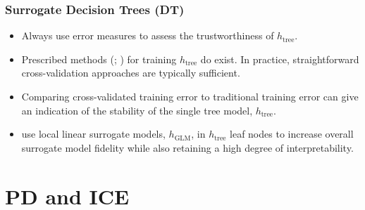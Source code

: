 \documentclass[11pt,
               aspectratio=169
               ]{beamer}
\begin{document}
		\begin{frame}
		
			\frametitle{Surrogate Decision Trees (DT)}
			
			\begin{itemize}
				
				\item Always use error measures to assess the trustworthiness of $h_{\text{tree}}$.
	
				\item Prescribed methods (\cite{dt_surrogate1}; \cite{dt_surrogate2}) for training $h_{\text{tree}}$ do exist. In practice, straightforward cross-validation approaches are typically sufficient. 
				
				\item Comparing cross-validated training error to traditional training error can give an indication of the stability of the single tree model, $h_{\text{tree}}$.
				
				\item \cite{lime-sup} use local linear surrogate models, $h_{\text{GLM}}$, in $h_{\text{tree}}$ leaf nodes to increase overall surrogate model fidelity while also retaining a high degree of interpretability.
				
			\end{itemize}
			
		\end{frame}

	\section{PD and ICE}
\end{document}
